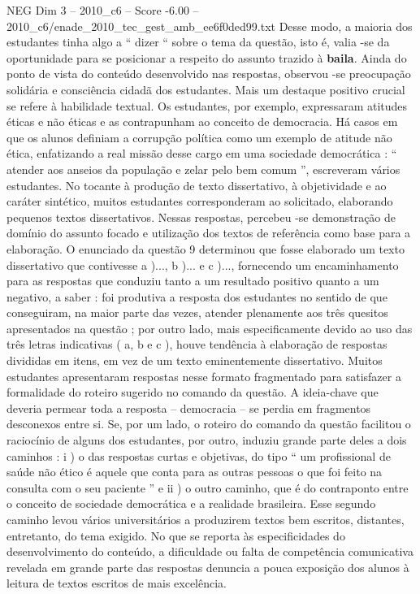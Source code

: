 \begin{textsample}{NEG Dim 3 – 2010\_c6 – Score -6.00 – 2010\_c6/enade\_2010\_tec\_gest\_amb\_ee6f0ded99.txt}
Desse modo, a maioria dos estudantes tinha algo a “ dizer “ sobre o tema da questão, isto é, valia -se da oportunidade para se posicionar a respeito do assunto trazido à \textbf{baila}.
Ainda do ponto de vista do conteúdo desenvolvido nas respostas, observou -se preocupação solidária e consciência cidadã dos estudantes.
Mais um destaque positivo crucial se refere à habilidade textual.
Os estudantes, por exemplo, expressaram atitudes éticas e não éticas e as contrapunham ao conceito de democracia.
Há casos em que os alunos definiam a corrupção política como um exemplo de atitude não ética, enfatizando a real missão desse cargo em uma sociedade democrática : “ atender aos anseios da população e zelar pelo bem comum ”, escreveram vários estudantes.
No tocante à produção de texto dissertativo, à objetividade e ao caráter sintético, muitos estudantes corresponderam ao solicitado, elaborando pequenos textos dissertativos.
Nessas respostas, percebeu -se demonstração de domínio do assunto focado e utilização dos textos de referência como base para a elaboração.
O enunciado da questão 9 determinou que fosse elaborado um texto dissertativo que contivesse a )..., b )... e c )..., fornecendo um encaminhamento para as respostas que conduziu tanto a um resultado positivo quanto a um negativo, a saber : foi produtiva a resposta dos estudantes no sentido de que conseguiram, na maior parte das vezes, atender plenamente aos três quesitos apresentados na questão ; por outro lado, mais especificamente devido ao uso das três letras indicativas ( a, b e c ), houve tendência à elaboração de respostas divididas em itens, em vez de um texto eminentemente dissertativo.
Muitos estudantes apresentaram respostas nesse formato fragmentado para satisfazer a formalidade do roteiro sugerido no comando da questão.
A ideia-chave que deveria permear toda a resposta – democracia – se perdia em fragmentos desconexos entre si.
Se, por um lado, o roteiro do comando da questão facilitou o raciocínio de alguns dos estudantes, por outro, induziu grande parte deles a dois caminhos : i ) o das respostas curtas e objetivas, do tipo “ um profissional de saúde não ético é aquele que conta para as outras pessoas o que foi feito na consulta com o seu paciente ” e ii ) o outro caminho, que é do contraponto entre o conceito de sociedade democrática e a realidade brasileira.
Esse segundo caminho levou vários universitários a produzirem textos bem escritos, distantes, entretanto, do tema exigido.
No que se reporta às especificidades do desenvolvimento do conteúdo, a dificuldade ou falta de competência comunicativa revelada em grande parte das respostas denuncia a pouca exposição dos alunos à leitura de textos escritos de mais excelência.

\end{textsample}
